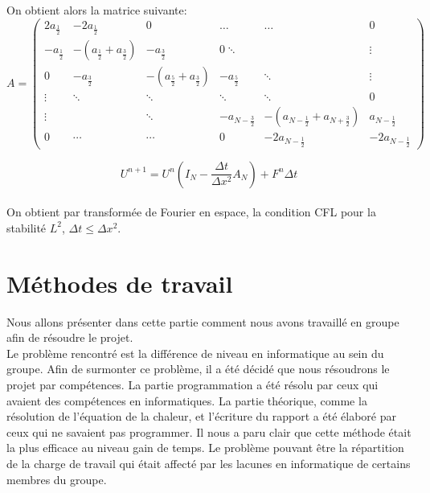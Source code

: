 \documentclass[a4paper,12pt,twoside]{report}
\begin{document}
On obtient alors la matrice suivante: \\

\begin{equation}
A = 
\begin{pmatrix}
   2 a_{\frac{1}{2}} & -2 a_{\frac{1}{2}} & 0 & \ldots & \ldots & 0\\
   -a_{\frac{1}{2}} & - (a_{\frac{1}{2}} + a_{\frac{3}{2}} ) & -a_{\frac{3}{2}} & 0 \ddots & & \vdots \\
   0 & -a_{\frac{3}{2}} & - (a_{\frac{5}{2}} + a_{\frac{3}{2}} ) & -a_{\frac{5}{2}} & \ddots & \vdots\\
   \vdots & \ddots & \ddots & \ddots &\ddots & 0\\
   \vdots & & \ddots & -a_{N -\frac{3}{2}} & - (a_{N - \frac{1}{2}} + a_{N +\frac{3}{2}} ) & a_{N - \frac{1}{2}}\\
   0 & \cdots & \cdots & 0 & -2 a_{N -\frac{1}{2}} & -2 a_{N -\frac{1}{2}}
\end{pmatrix}
\end{equation}




$$U^{n+1} = U^n(I_N - \frac{\Delta t}{ \Delta x^2} A_N)  + F^n \Delta t $$ \\

On obtient par transformée de Fourier en espace, la condition CFL pour la stabilité $L^2$, $\Delta t \leq \Delta x^2$.\\







\smallbreak

\section{Méthodes de travail}


Nous allons présenter dans cette partie comment nous avons travaillé en groupe afin de résoudre le projet.\\ 
\hspace*{1cm} Le problème rencontré est la différence de niveau en informatique au sein du groupe. Afin de surmonter ce problème, il a été décidé que nous résoudrons le projet par compétences. La partie programmation a été résolu par ceux qui avaient des compétences en informatiques. La partie théorique, comme la résolution de l'équation de la chaleur, et l'écriture du rapport a été élaboré par ceux qui ne savaient pas programmer. Il nous a paru clair que cette méthode était la plus efficace au niveau gain de temps. Le problème pouvant être la répartition de la charge de travail qui était affecté par les lacunes en informatique de certains membres du groupe.\\
\end{document}
